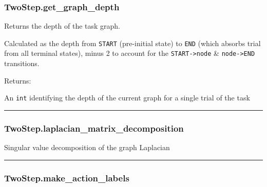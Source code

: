 \hypertarget{twostep.get_graph_depth}{%
\subsubsection{TwoStep.get\_graph\_depth}\label{twostep.get_graph_depth}}

\begin{Shaded}
\begin{Highlighting}[]
\NormalTok{)}
\end{Highlighting}
\end{Shaded}

Returns the depth of the task graph.

Calculated as the depth from \texttt{START} (pre-initial state) to
\texttt{END} (which absorbs trial from all terminal states), minus 2 to
account for the \texttt{START-\textgreater{}node} \&
\texttt{node-\textgreater{}END} transitions.

Returns:

An \texttt{int} identifying the depth of the current graph for a single
trial of the task

\begin{center}\rule{0.5\linewidth}{\linethickness}\end{center}

\hypertarget{twostep.laplacian_matrix_decomposition}{%
\subsubsection{TwoStep.laplacian\_matrix\_decomposition}\label{twostep.laplacian_matrix_decomposition}}

\begin{Shaded}
\begin{Highlighting}[]
\NormalTok{)}
\end{Highlighting}
\end{Shaded}

Singular value decomposition of the graph Laplacian

\begin{center}\rule{0.5\linewidth}{\linethickness}\end{center}

\hypertarget{twostep.make_action_labels}{%
\subsubsection{TwoStep.make\_action\_labels}\label{twostep.make_action_labels}}

